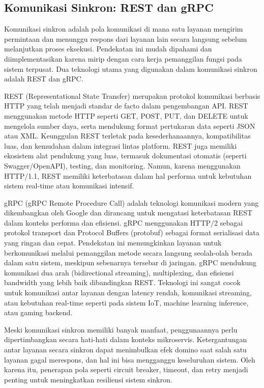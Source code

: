 \subsection{Komunikasi Sinkron: REST dan gRPC}

Komunikasi sinkron adalah pola komunikasi di mana satu layanan mengirim permintaan dan menunggu respons dari layanan lain secara langsung sebelum melanjutkan proses eksekusi. Pendekatan ini mudah dipahami dan diimplementasikan karena mirip dengan cara kerja pemanggilan fungsi pada sistem terpusat. Dua teknologi utama yang digunakan dalam komunikasi sinkron adalah REST dan gRPC.

REST (Representational State Transfer) merupakan protokol komunikasi berbasis HTTP yang telah menjadi standar de facto dalam pengembangan API. REST menggunakan metode HTTP seperti GET, POST, PUT, dan DELETE untuk mengelola sumber daya, serta mendukung format pertukaran data seperti JSON atau XML. Keunggulan REST terletak pada kesederhanaannya, kompatibilitas luas, dan kemudahan dalam integrasi lintas platform. REST juga memiliki ekosistem alat pendukung yang luas, termasuk dokumentasi otomatis (seperti Swagger/OpenAPI), testing, dan monitoring. Namun, karena menggunakan HTTP/1.1, REST memiliki keterbatasan dalam hal performa untuk kebutuhan sistem real-time atau komunikasi intensif.

gRPC (gRPC Remote Procedure Call) adalah teknologi komunikasi modern yang dikembangkan oleh Google dan dirancang untuk mengatasi keterbatasan REST dalam konteks performa dan efisiensi. gRPC menggunakan HTTP/2 sebagai protokol transport dan Protocol Buffers (protobuf) sebagai format serialisasi data yang ringan dan cepat. Pendekatan ini memungkinkan layanan untuk berkomunikasi melalui pemanggilan metode secara langsung seolah-olah berada dalam satu sistem, meskipun sebenarnya tersebar di jaringan. gRPC mendukung komunikasi dua arah (bidirectional streaming), multiplexing, dan efisiensi bandwidth yang lebih baik dibandingkan REST. Teknologi ini sangat cocok untuk komunikasi antar layanan dengan latency rendah, komunikasi streaming, atau kebutuhan real-time seperti pada sistem IoT, machine learning inference, atau gaming backend.

Meski komunikasi sinkron memiliki banyak manfaat, penggunaannya perlu dipertimbangkan secara hati-hati dalam konteks mikroservis. Ketergantungan antar layanan secara sinkron dapat menimbulkan efek domino saat salah satu layanan gagal merespons, dan hal ini bisa mengganggu keseluruhan sistem. Oleh karena itu, penerapan pola seperti circuit breaker, timeout, dan retry menjadi penting untuk meningkatkan resiliensi sistem sinkron.

